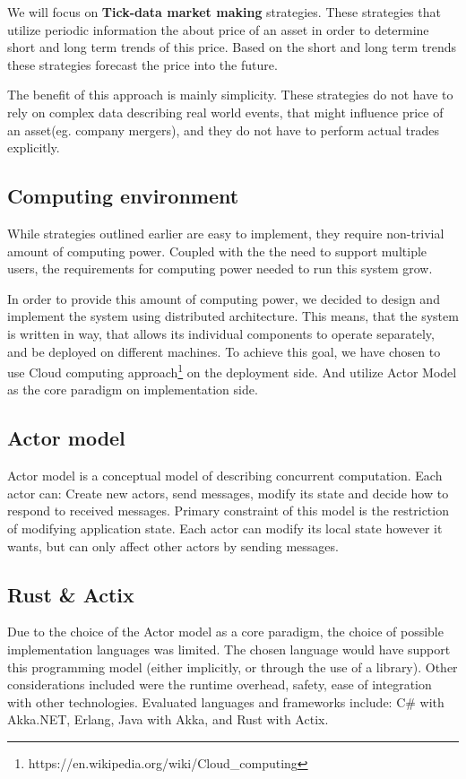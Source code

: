 \documentclass{ExcelAtFIT}
\begin{document}
    We will focus on \textbf{Tick-data market making} strategies.
    These strategies that utilize periodic information the about price of an asset in order to determine short and long term trends of this price.
    Based on the short and long term trends these strategies forecast the price into the future.

    The benefit of this approach is mainly simplicity. These strategies do not have to rely on complex data describing real world events, that might influence price
    of an asset(eg. company mergers), and they do not have to perform actual trades explicitly.


    \subsection{Computing environment}
    While strategies outlined earlier are easy to implement, they require non-trivial amount of computing power.
    Coupled with the the need to support multiple users, the requirements for computing power needed to
    run this system grow.

    In order to provide this amount of computing power, we decided to design and implement the system using distributed architecture.
    This means, that the system is written in way, that allows its individual components to operate separately, and be deployed on different machines.
    To achieve this goal, we have chosen to use Cloud computing approach\footnote{https://en.wikipedia.org/wiki/Cloud\_computing} on the deployment side.
    And utilize Actor Model as the core paradigm on implementation side.

    \subsection{Actor model}
    Actor model is a conceptual model of describing concurrent computation\cite{journal:actor}. Each actor can: Create new actors, send messages, modify its state and decide how to respond to
    received messages. Primary constraint of this model is the restriction of modifying application state.
    Each actor can modify its local state however it wants, but can only affect other actors by sending messages.

    \subsection{Rust \& Actix}
    Due to the choice of the Actor model as a core paradigm, the choice of possible implementation languages was limited.
    The chosen language would have support this programming model (either implicitly, or through the use of a library).
    Other considerations included were the runtime overhead, safety, ease of integration with other technologies.
    Evaluated languages and frameworks include: C\# with Akka.NET, Erlang, Java with Akka, and Rust with Actix.
\end{document}
